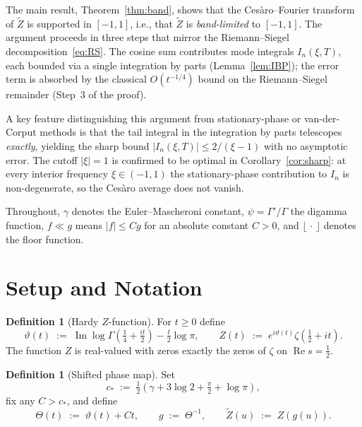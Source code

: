 \documentclass[12pt]{amsart}
\theoremstyle{definition}
\newtheorem{definition}[theorem]{Definition}
\theoremstyle{remark}
\DeclareMathOperator{\Ima}{Im}
\DeclareMathOperator{\Rea}{Re}
\begin{document}
The main result, Theorem~\ref{thm:band}, shows that the Ces\`{a}ro--Fourier
transform of $\widetilde{Z}$ is supported in $[-1,1]$, i.e., that $\widetilde{Z}$
is \emph{band-limited} to $[-1,1]$.  The argument proceeds in three steps
that mirror the Riemann--Siegel decomposition~\eqref{eq:RS}.  The cosine
sum contributes mode integrals $I_n(\xi,T)$, each bounded via a single
integration by parts (Lemma~\ref{lem:IBP}); the error term is absorbed by the
classical $O(t^{-1/4})$ bound on the Riemann--Siegel remainder (Step~3 of
the proof).

A key feature distinguishing this argument from stationary-phase or
van-der-Corput methods is that the tail integral in the integration by parts
telescopes \emph{exactly}, yielding the sharp bound
$|I_n(\xi,T)|\le 2/(\xi-1)$ with no asymptotic error.  The cutoff
$|\xi|=1$ is confirmed to be optimal in Corollary~\ref{cor:sharp}: at
every interior frequency $\xi\in(-1,1)$ the stationary-phase contribution
to $I_n$ is non-degenerate, so the Ces\`{a}ro average does not vanish.

Throughout, $\gamma$ denotes the Euler--Mascheroni constant,
$\psi=\Gamma'/\Gamma$ the digamma function, $f\ll g$ means
$|f|\le Cg$ for an absolute constant $C>0$, and $\lfloor\,\cdot\,\rfloor$
denotes the floor function.

\section{Setup and Notation}

\begin{definition}[Hardy $Z$-function]\label{def:Z}
For $t\ge 0$ define
\[
  \vartheta(t) \;:=\;
  \Ima\log\Gamma\!\left(\tfrac{1}{4}+\tfrac{it}{2}\right)
  -\tfrac{t}{2}\log\pi,
  \qquad
  Z(t) \;:=\; e^{i\vartheta(t)}\zeta\!\left(\tfrac{1}{2}+it\right).
\]
The function $Z$ is real-valued with zeros exactly the zeros of $\zeta$
on $\Rea s=\tfrac{1}{2}$.
\end{definition}

\begin{definition}[Shifted phase map]\label{def:Theta}
Set
\[
  c_* \;:=\; \tfrac{1}{2}\!\left(
    \gamma+3\log 2+\tfrac{\pi}{2}+\log\pi
  \right),
\]
fix any $C>c_*$, and define
\[
  \Theta(t) \;:=\; \vartheta(t)+Ct,
  \qquad
  g \;:=\; \Theta^{-1},
  \qquad
  \widetilde{Z}(u) \;:=\; Z(g(u)).
\]
\end{definition}
\end{document}

